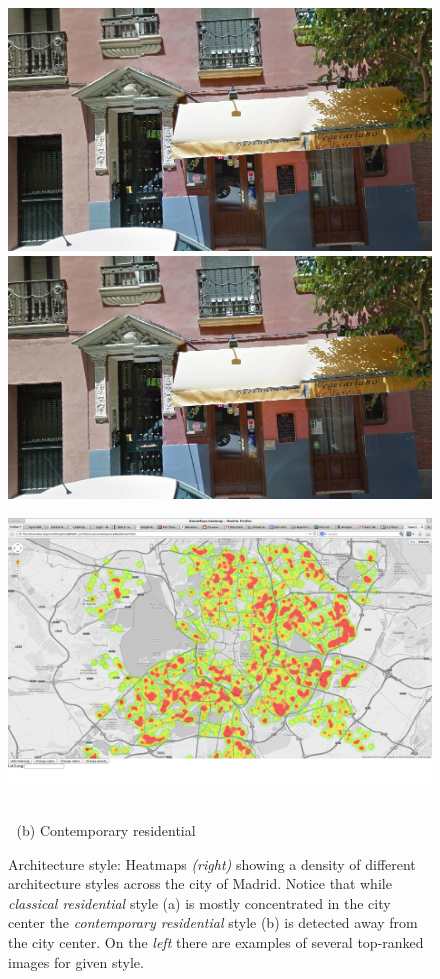 \documentclass[runningheads, table]{llncs}
\begin{document}
\begin{figure}
\begin{minipage}{\linewidth}
\begin{minipage}{0.3\linewidth}
      \\ \vspace{-3mm} \\
      \includegraphics[width=0.49\linewidth]{imgs/cutout_pitch04.jpg}
      \includegraphics[width=0.49\linewidth]{imgs/cutout_pitch04.jpg}
    \end{minipage}
    \begin{minipage}{0.7\linewidth}
      \includegraphics[trim= 350 150 250 150, clip=true, width=\linewidth]{imgs/arch/mapS3.jpg}
    \end{minipage}
  \end{minipage}
  \\
  $\;$\hspace{30mm} (b) Contemporary residential
  \\
  \caption{
    Architecture style: Heatmaps \emph{(right)} showing a density of different architecture styles across the city of Madrid. Notice that while \emph{classical residential} style (a) is mostly concentrated in the city center the \emph{contemporary residential} style (b) is detected away from the city center. On the \emph{left} there are examples of several top-ranked images for given style.
  }
\end{figure}
\end{document}
